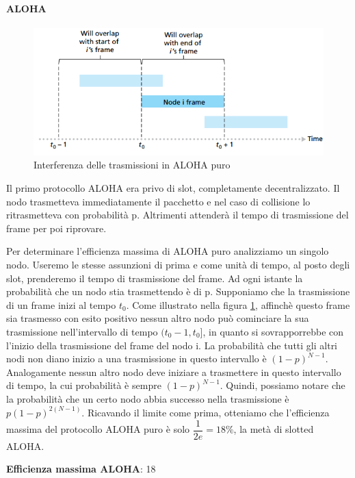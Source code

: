 \documentclass[11pt,a4paper]{book}
\begin{document}
\paragraph{ALOHA}
\begin{figure}
		\includegraphics[scale=0.6]{img/079.png}
		\caption{Interferenza delle trasmissioni in ALOHA puro}
		\label{fig: 079}
\end{figure}
Il primo protocollo ALOHA era privo di slot, completamente decentralizzato. Il nodo trasmetteva immediatamente il pacchetto e nel caso di collisione lo ritrasmetteva con probabilità p. Altrimenti attenderà il tempo di trasmissione del frame per poi riprovare.

Per determinare l'efficienza massima di ALOHA puro analizziamo un singolo nodo. Useremo le stesse assunzioni di prima e come unità di tempo, al posto degli slot, prenderemo il tempo di trasmissione del frame. Ad ogni istante la probabilità che un nodo stia trasmettendo è di p. Supponiamo che la trasmissione di un frame inizi al tempo $t_{0}$. Come illustrato nella figura \ref{fig: 079}, affinchè questo frame sia trasmesso con esito positivo nessun altro nodo può cominciare la sua trasmissione nell'intervallo di tempo $(t_{0} - 1, t_{0}]$, in quanto si sovrapporrebbe con l'inizio della trasmissione del frame del nodo i. La probabilità che tutti gli altri nodi non diano inizio a una trasmissione in questo intervallo è $(1 - p)^{N - 1}$. Analogamente nessun altro nodo deve iniziare a trasmettere in questo intervallo di tempo, la cui probabilità è sempre $(1 - p)^{N - 1}$. Quindi, possiamo notare che la probabilità che un certo nodo abbia successo nella trasmissione è $p(1 - p)^{2(N - 1)}$. Ricavando il limite come prima, otteniamo che l'efficienza massima del protocollo ALOHA puro è solo $\dfrac{1}{2e} = 18\%$, la metà di slotted ALOHA.
\begin{center}
	\textbf{Efficienza massima ALOHA}: 18%
\end{center}
\end{document}
